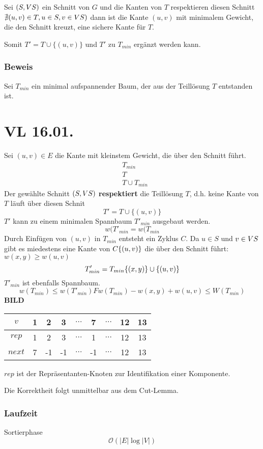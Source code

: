 \documentclass[a4paper,draft,twoside,10pt]{report}
\begin{document}
Sei $(S,V\/S) $ ein Schnitt von $G$ und die Kanten von $T$ respektieren diesen Schnitt $\nexists (u,v)\in T, u\in S, v\in V\/ S)$
dann ist die Kante $(u,v)$ mit minimalem Gewicht, die den Schnitt kreuzt, eine sichere Kante für $T$.

Somit $T' = T \cup \{(u,v)\}$ und $T' $ zu $T_{min}$ ergänzt werden kann.

\subsection{Beweis}
Sei $T_{min}$ ein minimal aufspannender Baum, der aus der Teillösung $T$ entstanden ist.

\chapter{VL 16.01.}
Sei $(u,v)\in E$ die Kante mit kleinstem Gewicht, die über den Schnitt führt.
\begin{align}
&T_{min}\\
&T\\
&T\cup T_{min}
\end{align}
Der gewählte Schnitt $(S,V\/S)$ \textbf{respektiert} die Teillösung $T$, d.h. keine Kante von $T$ läuft über diesen Schnit
\[T' =T\cup \{(u,v)\}\]
$T' $ kann zu einem minimalen Spannbaum $T'_{min} $ ausgebaut werden.
\[w(T'_{min}= w(T_{min}\]
Durch Einfügen von $(u,v)$ in $T_{min}$ entsteht ein Zyklus $C$.
Da $u\in S$ und $v\in V\/S$ gibt es miedestens eine Kante von $C\/\{(u,v)\}$ die über den Schnitt führt: $w(x,y) \geq w(u,v)$
\[T'_{min}=T_{min}\/ \{(x,y)\}\cup \{(u,v)\}\]
$T'_{min}$ ist ebenfalls Spannbaum.
\[w(T_{min})\leq w (T'_{min})Fw(T_{min})-w(x,y)+w(u,v)\leq W(T_{min})\] 
\textbf{BILD}
\begin{table}[H]
\begin{tabular}{ccccccccc}
$v$&1&2&3&$\hdots$&7&$\hdots$&12&13\\\hline
$rep$&1&2&3&$\hdots$&1&$\hdots$&12&13\\
$next$&7&-1&-1&$\hdots$&-1&$\hdots$&12&13\\
\end{tabular}
\end{table}
$rep$ ist der Repräsentanten-Knoten zur Identifikation einer Komponente.

Die Korrektheit folgt unmittelbar aus dem Cut-Lemma.

\subsection{Laufzeit}
Sortierphase 
\[\mathcal O(|E|\log |V|)\]
\end{document}
